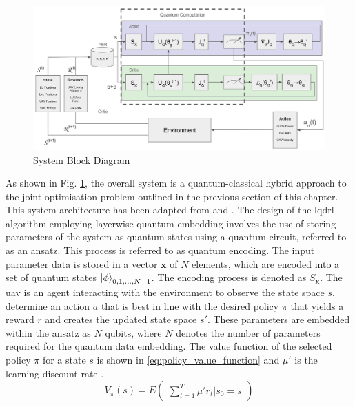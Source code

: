 \begin{figure} [ht!]
    \centering
    \includegraphics[width=1\textwidth]{figures/system_block_diagram_labelled.png}
    \caption{System Block Diagram}
    \label{fig:system_block_diagram}
\end{figure}
As shown in Fig. \ref{fig:system_block_diagram}, the overall system is a quantum-classical hybrid approach to the joint optimisation problem outlined in the previous section of this chapter. 
This system architecture has been adapted from \cite{silvirianti_layerwise_2024} and \cite{silvirianti_uav_2024}.
The design of the \acrshort{lqdrl} algorithm employing layerwise quantum embedding involves the use of storing parameters of the system as quantum states using a quantum circuit, referred to as an ansatz. 
This process is referred to as quantum encoding. 
The input parameter data is stored in a vector $\textbf{x}$ of $N$ elements, which are encoded into a set of quantum states $\ket{\phi}_{0, 1, \dots, N-1}$. 
The encoding process is denoted as $S_{\textbf{x}}$. 
The \acrshort{uav} is an agent interacting with the environment to observe the state space $s$, determine an action $a$ that is best in line with the desired policy $\pi$ that yields a reward $r$ and creates the updated state space $s'$. 
These parameters are embedded within the ansatz as $N$ qubits, where $N$ denotes the number of parameters required for the quantum data embedding. 
The value function of the selected policy $\pi$ for a state $s$ is shown in \ref{eq:policy_value_function} and $\mu'$ is the learning discount rate \cite{murphy2025reinforcementlearningoverview}. 
\begin{equation} \label{eq:policy_value_function}
   V_{\pi} (s) = E \begin{pmatrix}
       \sum_{t=1}^{T} \mu' r_{t} | s_{0}=s
   \end{pmatrix} 
\end{equation}
